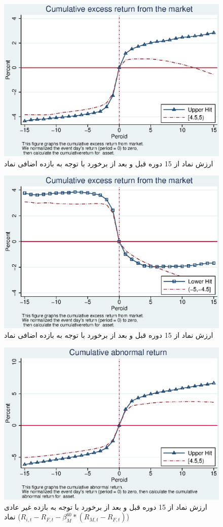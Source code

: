 \documentclass[12pt]{article}
\begin{document}
\begin{appendices}
\begin{figure}[htbp]
\centering
\includegraphics[width=0.8\columnwidth]{CUER.eps}
\caption{ارزش نماد از 15 دوره قبل  و بعد از برخورد  با توجه به بازده اضافی نماد }
\label{g15}
\end{figure}

\begin{figure}[htbp]
\centering
\includegraphics[width=0.8\columnwidth]{CLER.eps}
\caption{ارزش نماد از 15 دوره قبل  و بعد از برخورد  با توجه به بازده اضافی نماد }
\label{g16}
\end{figure}

\begin{figure}[htbp]
\centering
\includegraphics[width=0.8\columnwidth]{CUAR.eps}
\caption{ارزش نماد از 15 دوره قبل  و بعد از برخورد با توجه به بازده غیر عادی نماد
($ R_{i,t} - R_{F,t} - \beta^{60}_M * (R_{M,t} - R_{F,t}) $)
}
\label{g17}
\end{figure}


\end{appendices}
\end{document}
